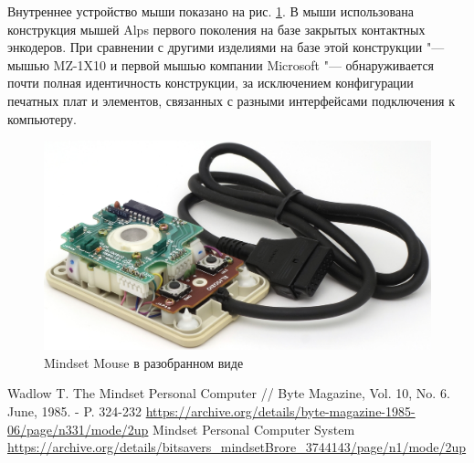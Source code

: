 \documentclass[11pt, a4paper]{article}
\begin{document}
Внутреннее устройство мыши показано на рис. \ref{fig:MindsetMouseInside}. В мыши использована конструкция мышей Alps первого поколения на базе закрытых контактных энкодеров. При сравнении с другими изделиями на базе этой конструкции "--- мышью MZ-1X10 и первой мышью компании Microsoft "--- обнаруживается почти полная идентичность конструкции, за исключением конфигурации печатных плат и элементов, связанных с разными интерфейсами подключения к компьютеру.

 \begin{figure}[h]
    \centering
    \includegraphics[scale=1]{1984_mindset_mouse/inside_30.jpg}
    \caption{Mindset Mouse в разобранном виде}
    \label{fig:MindsetMouseInside}
\end{figure}



\begin{thebibliography}{9}
 Wadlow T. The Mindset Personal Computer // Byte Magazine, Vol. 10, No. 6. June, 1985. - P. 324-232 \url{https://archive.org/details/byte-magazine-1985-06/page/n331/mode/2up}
 Mindset Personal Computer System \url{https://archive.org/details/bitsavers_mindsetBrore_3744143/page/n1/mode/2up}
\end{thebibliography}
\end{document}
